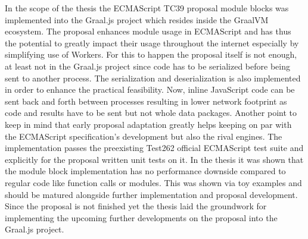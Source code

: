 
In the scope of the thesis the ECMAScript TC39 proposal module blocks was implemented into the Graal.js project which resides inside the GraalVM ecosystem. The proposal enhances module usage in ECMAScript and has thus the potential to greatly impact their usage throughout the internet especially by simplifying use of Workers. For this to happen the proposal itself is not enough, at least not in the Graal.js project since code has to be serialized before being sent to another process. The serialization and deserialization is also implemented in order to enhance the practical feasibility. Now, inline JavaScript code can be sent back and forth between processes resulting in lower network footprint as code and results have to be sent but not whole data packages. Another point to keep in mind that early proposal adaptation greatly helps keeping on par with the ECMAScript specification's development but also the rival engines. The implementation passes the preexisting Test262 official ECMAScript test suite and explicitly for the proposal written unit tests on it. In the thesis it was shown that the module block implementation has no performance downside compared to regular code like function calls or modules. This was shown via toy examples and should be matured alongside further implementation and proposal development. Since the proposal is not finished yet the thesis laid the groundwork for implementing the upcoming further developments on the proposal into the Graal.js project.


